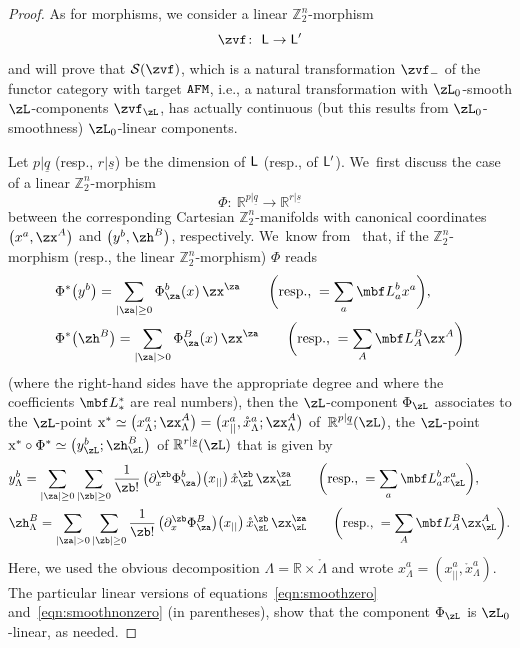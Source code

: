 \documentclass[10pt,a4paper]{amsart}
\newcommand{\R}{{\mathbb R}}
\newcommand{\Z}{{\mathbb Z}}
\def\ul{\underline}
\def\ul{\underline}
\newcommand{\0}{\otimes}
\newcommand{\z}{\Z_2^n}
\numberwithin{equation}{section}
\begin{document}
\begin{proof}
As for morphisms, we consider a linear $\z$-morphism
\[
\zvf\colon\ {\sf L}\to{\sf L}'
\]
and will prove that $\mathcal{S}(\zvf)$, which is a natural transformation $\zvf_-$ of the functor category with target $\tt AFM$, i.e., a natural transformation with $\zL_0$-smooth $\zL$-components $\zvf_\zL$, has actually continuous (but this results from $\zL_0$-smoothness) $\zL_0$-linear components.

Let $p|\ul q$ (resp., $r|\ul s$) be the dimension of $\sf L$ (resp., of $\sf L'$). We~first discuss the case of a linear $\z$-morphism
\[
\Phi\colon\ \R^{p|\ul q}\to \R^{r|\ul s}
\]
between the corresponding Cartesian $\z$-manifolds with canonical coordinates $\big(x^a,\zx^A\big)$ and $\big(y^b,\zh^B\big)$, respectively. We~know from~\cite{Bruce:2019b} that, if the $\z$-morphism (resp., the linear $\z$-morphism) $\Phi$ reads
%
\begin{subequations}
\begin{align}
& \Phi^*\big(y^b\big)=\sum_{|\za|\ge 0}\Phi_\za^b(x)\, \zx^\za\qquad
\bigg(\text{resp.,}\;=\sum_{a}{\mbf L}^b_a x^a\bigg),\label{coeffy}
\\
& \Phi^*\big(\zh^B\big)=\sum_{|\za|> 0}\Phi_\za^B(x)\, \zx^\za\qquad
\bigg(\text{resp.,}\;=\sum_A {\mbf L}^B_A\zx^A\bigg)\label{coeffh}
\end{align}
\end{subequations}
%
(where the right-hand sides have the appropriate degree and where the coefficients $\mbf L^{\ast}_\ast$ are real numbers), then the $\zL$-component $\Phi_\zL$ associates to the $\zL$-point ${\rm x}^*\simeq \big(x^a_\Lambda;\zx^A_\Lambda\big) =\big(x^a_{||},\mathring{x}_\Lambda^a;\zx^A_\Lambda \big)$ of~$\R^{p|\ul{q}}(\zL)$, the $\zL$-point ${\rm x}^*\circ\Phi^*\simeq \big(y_\zL^b;\zh_\zL^B\big)$ of $\R^{r|\ul{s}}(\zL)$ that is given by
%
\begin{subequations}
\begin{align}
& y^b_\Lambda = \sum_{|\za|\ge 0}\sum_{|\zb|\ge 0}\frac{1}{\zb!}\,\big(\partial_{x}^\zb\Phi_\za^b\big)\big(x_{||}\big)\,\mathring{x}_\zL^\zb\,\zx_\zL^\za\qquad
\bigg(\text{resp.,}\;=\sum_{a}{\mbf L}^b_a x_\zL^a\bigg), \label{eqn:smoothzero}
\\
& \zh^B_\Lambda =\sum_{|\za|> 0}\sum_{|\zb|\ge 0}\frac{1}{\zb!}\,\big(\partial_x^\zb\Phi_\za^B\big)\big(x_{||}\big)\,\mathring{x}_\zL^\zb\,\zx_\zL^\za\qquad
\bigg(\text{resp.,}\;=\sum_A {\mbf L}^B_A\zx_\zL^A\bigg). \label{eqn:smoothnonzero}
\end{align}
\end{subequations}
Here, we used the obvious decomposition $\Lambda = \R \times \mathring{\Lambda}$ and wrote $x^a_\Lambda = (x^a_{||}, \mathring{x}^a_{\Lambda})$. The particular linear versions of equations~\eqref{eqn:smoothzero} and~\eqref{eqn:smoothnonzero} (in parentheses), show that the component $\Phi_\zL$ is $\zL_0$-linear, as needed.


\end{proof}
\end{document}

